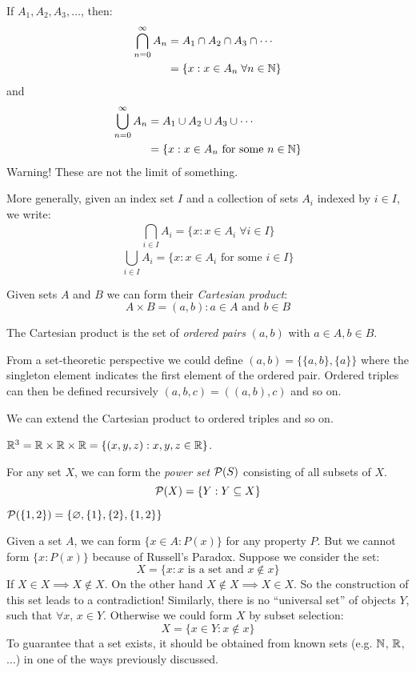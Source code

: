 \documentclass[../main.tex]{subfiles}
\begin{document}
\begin{remark}[Notation]
  If $A_1, A_2, A_3, \ldots$, then:
  \begin{align*}
    \bigcap_{n=0}^{\infty} A_n &= A_1 \cap A_2 \cap A_3 \cap \cdots \\
                               &= \{x: x \in A_n\;\forall n \in \mathbb{N}\}
  \end{align*}
  and
  \begin{align*}
    \bigcup_{n=0}^{\infty} A_n &= A_1 \cup A_2 \cup A_3 \cup \cdots \\
                               &= \{x: x \in A_n \text{ for some } n \in \mathbb{N}\}
  \end{align*}
  Warning! These are not the limit of something.

  More generally, given an index set $I$ and a collection of sets $A_i$ indexed by $i \in I$, we write:
  \[
    \bigcap_{i \in I}^{} A_i = \{x: x \in A_i\;\forall i \in I\}
  \]
  \[
    \bigcup_{i \in I}^{} A_i = \{x: x \in A_i \text{ for some } i \in I\}
  \]
\end{remark}
\begin{definition}
  Given sets $A$ and $B$ we can form their \textit{Cartesian product}:
  \[
    A \times B = {(a, b): a \in A \text{ and } b \in B}
  \]
\end{definition}
The Cartesian product is the set of \textit{ordered pairs} $(a, b)$ with $a \in A, b \in B$.
\begin{remark}
From a set-theoretic perspective we could define $(a, b) = \{\{a, b\}, \{a\}\}$ where the singleton element indicates the first element of the ordered pair.
Ordered triples can then be defined recursively $(a, b, c) = ((a, b), c)$ and so on.
\end{remark}

We can extend the Cartesian product to ordered triples and so on.
\begin{example}
  $\mathbb{R}^3 = \mathbb{R} \times \mathbb{R} \times \mathbb{R} = \{(x, y, z) : x, y, z \in \mathbb{R}\}$.
\end{example}
\begin{definition}
  For any set $X$, we can form the \textit{power set} $\mathcal{P}(S)$ consisting of all subsets of $X$.
  \[
    \mathcal{P}(X) = \{Y: Y \subseteq X\}
  \]
\end{definition}
\begin{example}
  $\mathcal{P}(\{1, 2\}) = \{ \varnothing, \{1\}, \{2\}, \{1, 2\}\}$
\end{example}
\begin{remark}[Warning]
  Given a set $A$, we can form $\{x \in A: P(x)\}$ for any property $P$.
  But we cannot form $\{x: P(x)\}$ because of Russell's Paradox. Suppose we consider the set:
  \[
    X = \{x: x \text{ is a set and } x \notin x\}
  \]
  If $X \in X \implies X \notin X$.
  On the other hand $X \notin X \implies X \in X$.
  So the construction of this set leads to a contradiction!
  Similarly, there is no ``universal set'' of objects $Y$, such that $\forall x$, $x \in Y$.
  Otherwise we could form $X$ by subset selection:
  \[
    X = \{x \in Y: x \notin x\}
  \]
  To guarantee that a set exists, it should be obtained from known sets (e.g. $\mathbb{N}$, $\mathbb{R}$, $\ldots$) in one of the ways previously discussed.
\end{remark}
\end{document}
